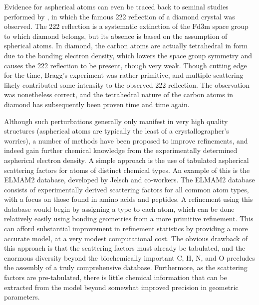 \begin{refsection}
Evidence for aspherical atoms can even be traced back to seminal studies performed by \citeauthor{Bragg1920}, in which the famous 222 reflection of a diamond crystal was observed.
The 222 reflection is a systematic extinction of the $ \text{Fd}\bar{3}\text{m} $ space group to which diamond belongs, but its absence is based on the assumption of spherical atoms.
In diamond, the carbon atoms are actually tetrahedral in form due to the bonding electron density, which lowers the space group symmetry and causes the 222 reflection to be present, though very weak.\autocite{Bragg1920}
Though cutting edge for the time, Bragg's experiment was rather primitive, and multiple scattering likely contributed some intensity to the observed 222 reflection.
The observation was nonetheless correct, and the tetrahedral nature of the carbon atoms in diamond has subsequently been proven time and time again.

Although such perturbations generally only manifest in very high quality structures (aspherical atoms are typically the least of a crystallographer's worries), a number of methods have been proposed to improve refinements, and indeed gain further chemical knowledge from the experimentally determined aspherical electron density.
A simple approach is the use of tabulated aspherical scattering factors for atoms of distinct chemical types.
An example of this is the ELMAM2 database, developed by Jelsch and co-workers.\autocite{Domagaa2012}
The ELMAM2 database consists of experimentally derived scattering factors for all common atom types, with a focus on those found in amino acids and peptides.
A refinement using this database would begin by assigning a type to each atom, which can be done relatively easily using bonding geometries from a more primitive refinement.
This can afford substantial improvement in refinement statistics by providing a more accurate model, at a very modest computational cost.
The obvious drawback of this approach is that the scattering factors must already be tabulated, and the enormous diversity beyond the biochemically important C, H, N, and O precludes the assembly of a truly comprehensive database.
Furthermore, as the scattering factors are pre-tabulated, there is little chemical information that can be extracted from the model beyond somewhat improved precision in geometric parameters.


\end{refsection}
